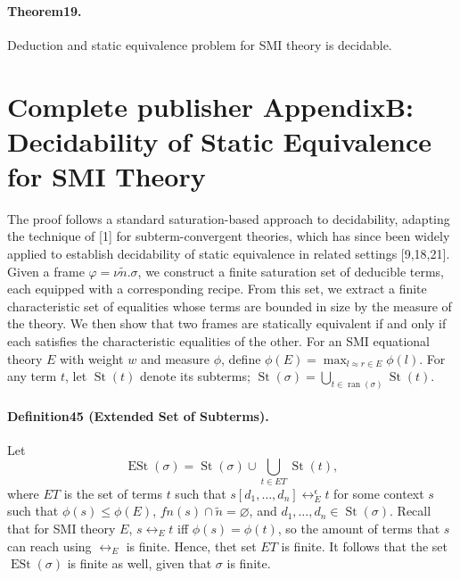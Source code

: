 \paragraph{Theorem19.} Deduction and static equivalence problem for SMI theory is decidable.

\section*{Complete publisher AppendixB: Decidability of Static Equivalence for SMI Theory}
The proof follows a standard saturation-based approach to decidability, adapting the technique of [1] for subterm-convergent theories, which has since been widely applied to establish decidability of static equivalence in related settings [9,18,21].
Given a frame $\varphi=\nu\tilde n.\sigma$, we construct a finite saturation set of deducible terms, each equipped with a corresponding recipe. From this set, we extract a finite characteristic set of equalities whose terms are bounded in size by the measure of the theory. We then show that two frames are statically equivalent if and only if each satisfies the characteristic equalities of the other.
For an SMI equational theory $E$ with weight $w$ and measure $\phi$, define $\phi(E)=\max_{l\approx r\in E}\phi(l)$. For any term $t$, let $\operatorname{St}(t)$ denote its subterms; $\operatorname{St}(\sigma)=\bigcup_{t\in\operatorname{ran}(\sigma)}\operatorname{St}(t)$.
\paragraph{Definition45 (Extended Set of Subterms).} Let
\[
\operatorname{ESt}(\sigma)=\operatorname{St}(\sigma)\cup\bigcup_{t\in ET}\operatorname{St}(t),
\]
where $ET$ is the set of terms $t$ such that $s[d_1,\ldots,d_n]\leftrightarrow_E^\epsilon t$ for some context $s$ such that $\phi(s)\le\phi(E)$, $fn(s)\cap\tilde n=\varnothing$, and $d_1,\ldots,d_n\in\operatorname{St}(\sigma)$.
Recall that for SMI theory $E$, $s\leftrightarrow_Et$ iff $\phi(s)=\phi(t)$, so the amount of terms that $s$ can reach using $\leftrightarrow_E$ is finite. Hence, thet set $ET$ is finite. It follows that the set $\operatorname{ESt}(\sigma)$ is finite as well, given that $\sigma$ is finite.
